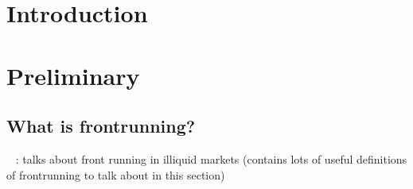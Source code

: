 
\section{Introduction}




\section{Preliminary}

\subsection{What is frontrunning?} %

~\cite{liang2005distressed} : talks about front running in illiquid markets (contains lots of useful definitions of frontrunning to talk about in this section)




















